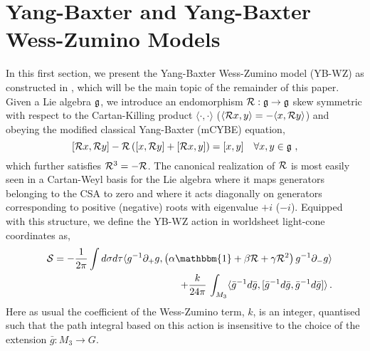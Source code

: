 \documentclass[12pt]{article}
\def\ee{\boldsymbol{e}}
\def\be{\begin{equation}}
\def\ee{\end{equation}}
\begin{document}
     \section{Yang-Baxter and Yang-Baxter Wess-Zumino Models}\label{s1} 
       In this first section, we present the Yang-Baxter Wess-Zumino model (YB-WZ) as constructed in \cite{Delduc:2014uaa}, which will be the main topic of the remainder of this paper. Given a Lie algebra $\frak{g}$, we introduce an endomorphism $\cal{R}: \frak{g} \to    \frak{g}$ skew symmetric with respect to the Cartan-Killing product $\langle \cdot , \cdot  \rangle $  ($\langle {\cal{R}}x , y  \rangle=- \langle x, {\cal{R}} y  \rangle$) and obeying the modified classical Yang-Baxter (mCYBE) equation,
 \be \label{eq:mcybe}
[{\cal R} x,  {\cal R} y]  - {\cal R} \left( [x, {\cal R} y ] + [ {\cal R}x, y] \right)  = [x, y] \quad  \forall x, y \in \frak{g}  \ , 
 \ee 
 which further satisfies ${\cal R}^3= - {\cal R}$. The canonical realization of ${\cal R}$ is most easily seen in a Cartan-Weyl basis for the Lie algebra where it maps generators belonging to the CSA to zero and where it acts diagonally on generators corresponding to positive (negative) roots with eigenvalue $+i$ ($-i$).  Equipped with this structure, we define the YB-WZ action in worldsheet light-cone coordinates as,
 \begin{eqnarray}
\label{eq:act}
  &&{\cal S }= -\frac{1}{2\pi}\int d \sigma d\tau    \langle g^{-1} \partial_+g , \left(\alpha \mathbbm{1} + \beta {\cal R}  + \gamma  {\cal R}^2 \right)g^{-1} \partial_- g \rangle  \nonumber\\
&&\qquad\qquad + \frac{  k}{24\pi } \,      \int_{M_3}     \langle   \bar g^{-1} d\bar g, [\bar g^{-1} d\bar g,\bar g^{-1} d\bar g]  \rangle\,.
\end{eqnarray} 
Here as usual the coefficient of the Wess-Zumino term, $k$, is an integer, quantised such that the path integral based on this action is insensitive to the choice of the extension $\bar{g}: M_{3} \to G$. 
   
\end{document}

